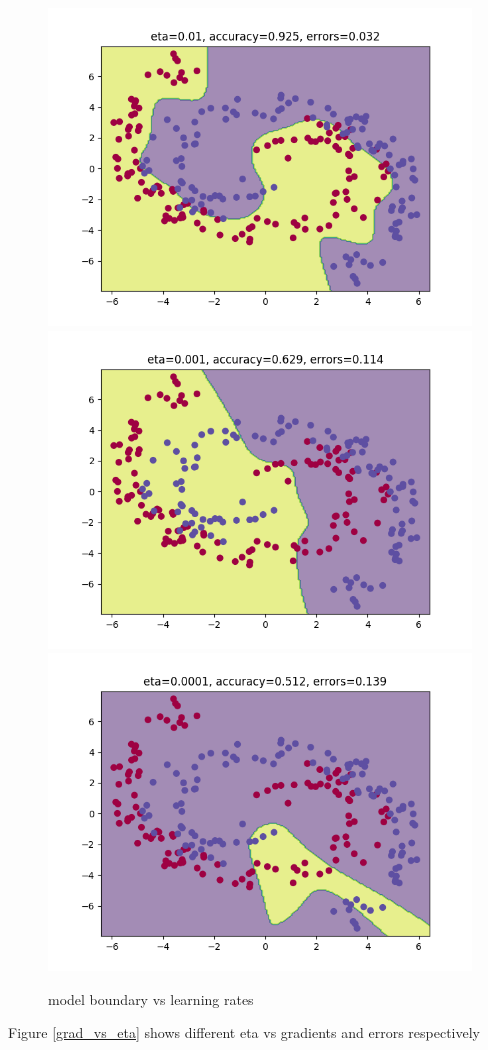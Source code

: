 \documentclass[11pt]{article}
\begin{document}
\begin{figure}[H]
	\includegraphics[scale=0.5]{images/NN_boundary_vs_learning_rates/2}
	\includegraphics[scale=0.5]{images/NN_boundary_vs_learning_rates/3}
	\centering
	\includegraphics[scale=0.5]{images/NN_boundary_vs_learning_rates/4}
	\caption{model boundary vs learning rates}
	\label{fig: learning_rate_boundary}

\end{figure}
Figure \ref{grad_vs_eta} shows different eta vs gradients and errors respectively
\end{document}
